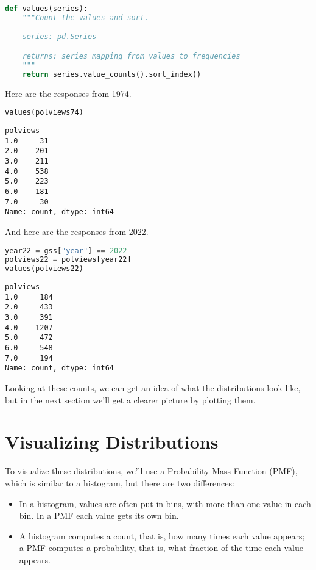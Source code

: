 \begin{lstlisting}[language=Python,style=source]
def values(series):
    """Count the values and sort.

    series: pd.Series

    returns: series mapping from values to frequencies
    """
    return series.value_counts().sort_index()
\end{lstlisting}

Here are the responses from 1974.

\begin{lstlisting}[language=Python,style=source]
values(polviews74)
\end{lstlisting}

\begin{lstlisting}[style=output]
polviews
1.0     31
2.0    201
3.0    211
4.0    538
5.0    223
6.0    181
7.0     30
Name: count, dtype: int64
\end{lstlisting}

And here are the responses from 2022.

\begin{lstlisting}[language=Python,style=source]
year22 = gss["year"] == 2022
polviews22 = polviews[year22]
values(polviews22)
\end{lstlisting}

\begin{lstlisting}[style=output]
polviews
1.0     184
2.0     433
3.0     391
4.0    1207
5.0     472
6.0     548
7.0     194
Name: count, dtype: int64
\end{lstlisting}

Looking at these counts, we can get an idea of what the distributions
look like, but in the next section we'll get a clearer picture by
plotting them.

\hypertarget{visualizing-distributions}{%
\section{Visualizing Distributions}\label{visualizing-distributions}}

To visualize these distributions, we'll use a Probability Mass Function
(PMF), which is similar to a histogram, but there are two differences:

\begin{itemize}
\item
  In a histogram, values are often put in bins, with more than one value
  in each bin. In a PMF each value gets its own bin.
\item
  A histogram computes a count, that is, how many times each value
  appears; a PMF computes a probability, that is, what fraction of the
  time each value appears.
\end{itemize}

